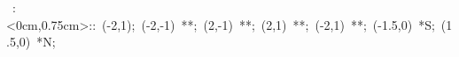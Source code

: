 
%
%


\hbox{
\xy    <2cm,0cm>:<0cm,0.75cm>::
       (-2,1); (-2,-1) **\dir{-}; (2,-1) **\dir{-}; 
       (2,1) **\dir{-};  (-2,1) **\dir{-};
       (-1.5,0) *{\bigrm S}; (1.5,0) *{\bigrm N};  
\endxy}


